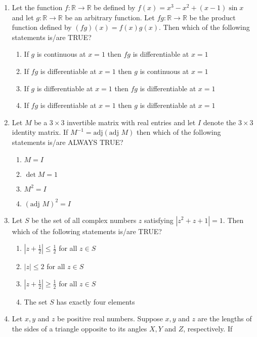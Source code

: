 \documentclass{article}
\begin{document}
\begin{enumerate}
\item   Let the function $f: \mathbb{R} \to \mathbb{R}$ be defined by $f(x) = x^3 - x^2 + (x - 1) \sin x$ and let $g: \mathbb{R} \to \mathbb{R}$ be an arbitrary function. Let $fg: \mathbb{R} \to \mathbb{R}$ be the product function defined by $(fg)(x) = f(x)g(x)$. Then which of the following statements is/are TRUE?

    \begin{enumerate}
        \item  If $g$ is continuous at $x = 1$ then $fg$ is differentiable at $x = 1$
        \item  If $fg$ is differentiable at $x = 1$ then $g$ is continuous at $x = 1$
        \item  If $g$ is differentiable at $x = 1$ then $fg$ is differentiable at $x = 1$
        \item  If $fg$ is differentiable at $x = 1$ then $g$ is differentiable at $x = 1$
    \end{enumerate}

\item   Let $M$ be a $3 \times 3$ invertible matrix with real entries and let $I$ denote the $3 \times 3$ identity matrix. If $ M^{-1} = \text{adj}(\text{adj } M)$ then which of the following statements is/are ALWAYS TRUE?

    \begin{enumerate}
        \item  $M = I$
        \item  $\det M = 1$
        \item  $M^2 = I$
        \item  $(\text{adj } M)^2 = I$
    \end{enumerate}
\item   Let $S$ be the set of all complex numbers $z$ satisfying $|z^2 + z + 1| = 1$. Then which of the following statements is/are TRUE?

    \begin{enumerate}
        \item  $|z + \frac{1}{2}| \leq \frac{1}{2}$ for all $z \in S$
        \item  $|z| \leq 2$ for all $z \in S$
        \item  $|z + \frac{1}{2}| \geq \frac{1}{2}$ for all $z \in S$
        \item  The set $S$ has exactly four elements
    \end{enumerate}

\item   Let $x, y$ and $z$ be positive real numbers. Suppose $x, y$ and $z$ are the lengths of the sides of a triangle opposite to its angles $X, Y$ and $Z$, respectively. If 


\end{enumerate}
\end{document}
